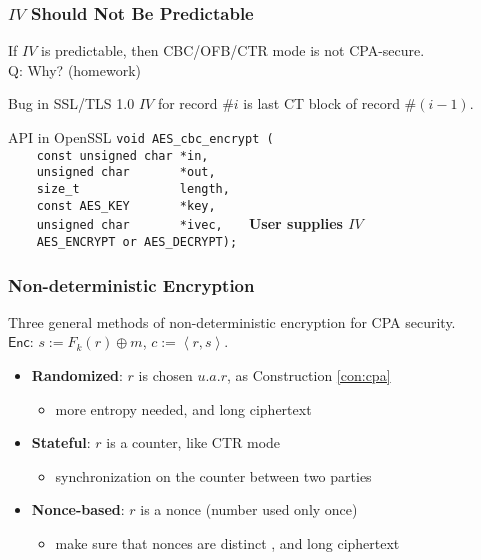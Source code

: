 \begin{frame}[fragile]\frametitle{$IV$ Should Not Be Predictable}
If $IV$ is predictable, then CBC/OFB/CTR mode is not CPA-secure.\\
\alert{Q: Why? (homework)}
\begin{exampleblock}{Bug in SSL/TLS 1.0}
$IV$ for record $\#i$ is last CT block of record $\#(i-1)$.
\end{exampleblock}
\begin{exampleblock}{API in OpenSSL}
\verb#void AES_cbc_encrypt (# \\
\verb#    const unsigned char *in,# \\
\verb#    unsigned char       *out,# \\
\verb#    size_t              length,# \\
\verb#    const AES_KEY       *key,# \\
\verb#    unsigned char       *ivec,   #  \alert{\textbf{User supplies $IV$}} \\
\verb#    AES_ENCRYPT or AES_DECRYPT);# \\
\end{exampleblock}
\end{frame}
\begin{frame}\frametitle{Non-deterministic Encryption}
Three general methods of non-deterministic encryption for CPA security.\\
$\mathsf{Enc}$: $s := F_k(r)\oplus m$, $c := \left<r, s\right>$.
\begin{itemize}
\item \textbf{Randomized}: $r$ is chosen $u.a.r$, as Construction \ref{con:cpa}
\begin{itemize}
\item more entropy needed, and long ciphertext
\end{itemize}
\item \textbf{Stateful}: $r$ is a counter, like CTR mode
\begin{itemize}
\item synchronization on the counter between two parties
\end{itemize}
\item \textbf{Nonce-based}: $r$ is a nonce (number used only once)
\begin{itemize}
\item make sure that nonces are distinct , and long ciphertext
\end{itemize}
\end{itemize}
\end{frame}
